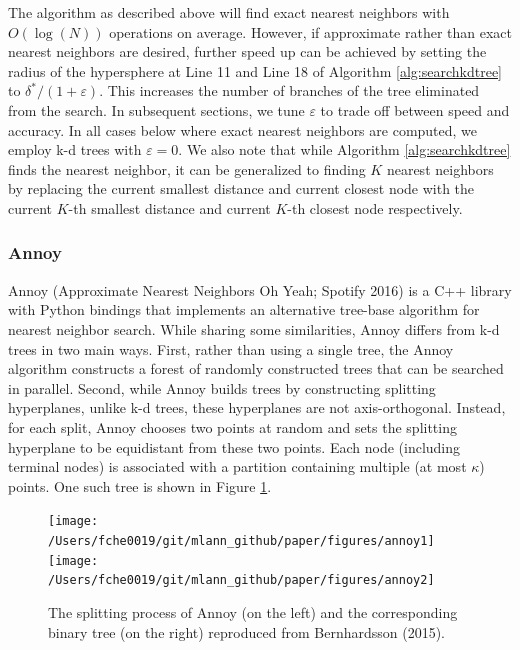\documentclass[12pt]{article}
\begin{document}
The algorithm as described above will find exact nearest neighbors with \(O(\log(N))\) operations on average. However, if approximate rather than exact nearest neighbors are desired, further speed up can be achieved by setting the radius of the hypersphere at Line 11 and Line 18 of Algorithm \ref{alg:searchkdtree} to \(\delta^*/(1+\varepsilon)\). This increases the number of branches of the tree eliminated from the search. In subsequent sections, we tune \(\varepsilon\) to trade off between speed and accuracy. In all cases below where exact nearest neighbors are computed, we employ k-d trees with \(\varepsilon=0\). We also note that while Algorithm \ref{alg:searchkdtree} finds the nearest neighbor, it can be generalized to finding \(K\) nearest neighbors by replacing the current smallest distance and current closest node with the current \(K\)-th smallest distance and current \(K\)-th closest node respectively.

\hypertarget{annoy}{%
\subsubsection*{Annoy}\label{annoy}}

Annoy (Approximate Nearest Neighbors Oh Yeah; Spotify 2016) is a C++ library with Python bindings that implements an alternative tree-base algorithm for nearest neighbor search. While sharing some similarities, Annoy differs from k-d trees in two main ways. First, rather than using a single tree, the Annoy algorithm constructs a forest of randomly constructed trees that can be searched in parallel. Second, while Annoy builds trees by constructing splitting hyperplanes, unlike k-d trees, these hyperplanes are not axis-orthogonal. Instead, for each split, Annoy chooses two points at random and sets the splitting hyperplane to be equidistant from these two points. Each node (including terminal nodes) is associated with a partition containing multiple (at most \(\kappa\)) points. One such tree is shown in Figure \ref{fig:annoy}.



\begin{figure}

{\centering \texttt{[image: /Users/fche0019/git/mlann\_github/paper/figures/annoy1]} \texttt{[image: /Users/fche0019/git/mlann\_github/paper/figures/annoy2]} 

}

\caption{The splitting process of Annoy (on the left) and the corresponding binary tree (on the right) reproduced from Bernhardsson (2015).}\label{fig:annoy}
\end{figure}
\end{document}
